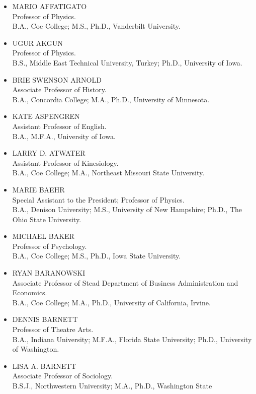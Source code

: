 \documentclass[
  letterpaper,
]{scrbook}
\begin{document}
\begin{itemize}
\item
  MARIO AFFATIGATO\\
  Professor of Physics.\\
  B.A., Coe College; M.S., Ph.D., Vanderbilt University.
\item
  UGUR AKGUN\\
  Professor of Physics.\\
  B.S., Middle East Technical University, Turkey; Ph.D., University of
  Iowa.
\item
  BRIE SWENSON ARNOLD\\
  Associate Professor of History.\\
  B.A., Concordia College; M.A., Ph.D., University of Minnesota.
\item
  KATE ASPENGREN\\
  Assistant Professor of English.\\
  B.A., M.F.A., University of Iowa.
\item
  LARRY D. ATWATER\\
  Assistant Professor of Kinesiology.\\
  B.A., Coe College; M.A., Northeast Missouri State University.
\item
  MARIE BAEHR\\
  Special Assistant to the President; Professor of Physics.\\
  B.A., Denison University; M.S., University of New Hampshire; Ph.D.,
  The Ohio State University.
\item
  MICHAEL BAKER\\
  Professor of Psychology.\\
  B.A., Coe College; M.S., Ph.D., Iowa State University.
\item
  RYAN BARANOWSKI\\
  Associate Professor of Stead Department of Business Administration and
  Economics.\\
  B.A., Coe College; M.A., Ph.D., University of California, Irvine.
\item
  DENNIS BARNETT\\
  Professor of Theatre Arts.\\
  B.A., Indiana University; M.F.A., Florida State University; Ph.D.,
  University of Washington.
\item
  LISA A. BARNETT\\
  Associate Professor of Sociology.\\
  B.S.J., Northwestern University; M.A., Ph.D., Washington State

\end{itemize}
\end{document}
